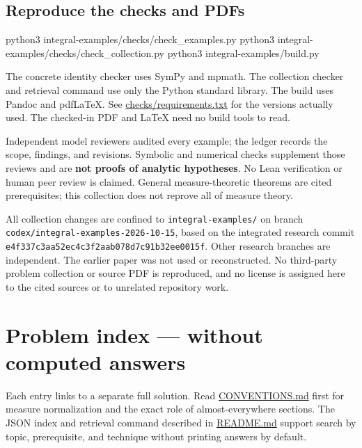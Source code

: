 \documentclass[
  11pt,
]{article}
\newenvironment{Shaded}{}{}
\newcommand{\ExtensionTok}[1]{#1}
\newcommand{\NormalTok}[1]{#1}
\begin{document}
\subsection{Reproduce the checks and
PDFs}\label{reproduce-the-checks-and-pdfs}

\begin{Shaded}
\begin{Highlighting}[]
\ExtensionTok{python3}\NormalTok{ integral{-}examples/checks/check\_examples.py}
\ExtensionTok{python3}\NormalTok{ integral{-}examples/checks/check\_collection.py}
\ExtensionTok{python3}\NormalTok{ integral{-}examples/build.py}
\end{Highlighting}
\end{Shaded}

The concrete identity checker uses SymPy and mpmath. The collection
checker and retrieval command use only the Python standard library. The
build uses Pandoc and pdfLaTeX. See
\href{https://github.com/Drsunflowerherbert/Codex-for-Math/tree/codex/integral-examples-2026-10-15/integral-examples/checks/requirements.txt}{checks/requirements.txt}
for the versions actually used. The checked-in PDF and LaTeX need no
build tools to read.

Independent model reviewers audited every example; the ledger records
the scope, findings, and revisions. Symbolic and numerical checks
supplement those reviews and are \textbf{not proofs of analytic
hypotheses}. No Lean verification or human peer review is claimed.
General measure-theoretic theorems are cited prerequisites; this
collection does not reprove all of measure theory.

All collection changes are confined to \texttt{integral-\allowbreak{}examples/\allowbreak{}} on
branch \texttt{codex/\allowbreak{}integral-\allowbreak{}examples-\allowbreak{}2026-\allowbreak{}10-\allowbreak{}15}, based on the
integrated research commit
\texttt{e4f337c3\allowbreak{}aa52ec4c\allowbreak{}3f2aab07\allowbreak{}8d7c91b3\allowbreak{}2ee0015f}. Other research
branches are independent. The earlier paper was not used or
reconstructed. No third-party problem collection or source PDF is
reproduced, and no license is assigned here to the cited sources or to
unrelated repository work.

\section{Problem index --- without computed answers}\label{problems}

Each entry links to a separate full solution. Read
\hyperref[conventions]{CONVENTIONS.md} first for measure normalization
and the exact role of almost-everywhere sections. The JSON index and
retrieval command described in \hyperref[start]{README.md} support
search by topic, prerequisite, and technique without printing answers by
default.
\end{document}
